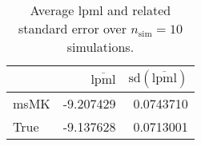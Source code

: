 \begin{table}[H]

\caption{Average lpml and related standard error over $n_{\text{sim}} = 10$ simulations.}
\centering
\begin{tabular}[t]{lrr}
\toprule
  & $\overbar{\text{lpml}}$ & $\text{sd}(\overbar{\text{lpml}})$\\
\midrule
msMK & -9.207429 & 0.0743710\\
True & -9.137628 & 0.0713001\\
\bottomrule
\end{tabular}
\end{table}